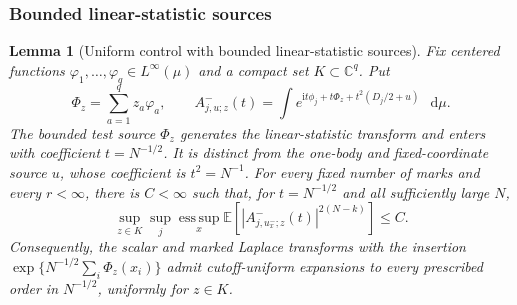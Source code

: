 \documentclass[11pt,reqno]{amsart}
\numberwithin{equation}{section}
\theoremstyle{plain}
\newtheorem{lemma}[lemma]{Lemma}
\theoremstyle{definition}
\newcommand{\dd}{\mathop{}\!\mathrm d}
\newcommand{\E}{\mathbb E}
\begin{document}
\subsubsection{Bounded linear-statistic sources}
\label{rep:subsubsec:signed-linear-sources}
\begin{lemma}[Uniform control with bounded linear-statistic sources]\label{rep:lem:linear-source-control}
Fix centered functions $\varphi_1,\ldots,\varphi_q\in L^\infty(\mu)$ and a compact set $K\subset\mathbb C^q$.  Put
\begin{equation}\label{rep:eq:Phi-z}
 \Phi_z=\sum_{a=1}^qz_a\varphi_a,
 \qquad
 A^-_{j,u;z}(t)=\int
 e^{\mathrm{i} t\phi_j+t\Phi_z+t^2(D_j/2+u)}\,\dd\mu.
\end{equation}
The bounded test source $\Phi_z$ generates the linear-statistic transform and enters with coefficient $t=N^{-1/2}$. It is distinct from the one-body and fixed-coordinate source $u$, whose coefficient is $t^2=N^{-1}$.
For every fixed number of marks and every $r<\infty$, there is $C<\infty$ such that, for $t=N^{-1/2}$ and all sufficiently large $N$,
\begin{equation}\label{rep:eq:linear-source-moment}
 \sup_{z\in K}\sup_j\operatorname*{ess\,sup}_x
 \E\left[|A^-_{j,u_x^-;z}(t)|^{2(N-k)}\right]\le C.
\end{equation}
Consequently, the scalar and marked Laplace transforms with the insertion
$\exp\{N^{-1/2}\sum_i\Phi_z(x_i)\}$ admit cutoff-uniform expansions to every prescribed order in $N^{-1/2}$, uniformly for $z\in K$.
\end{lemma}
\end{document}
